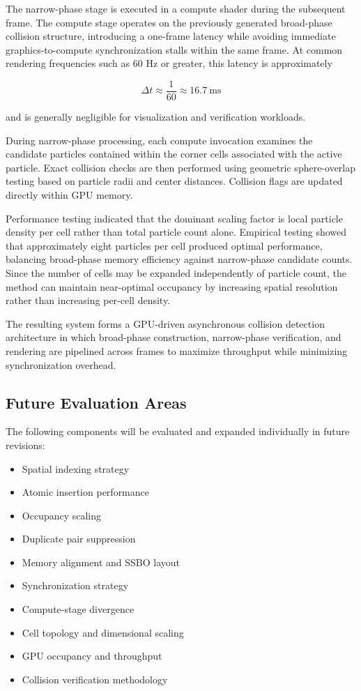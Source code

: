 \documentclass{article}
\begin{document}
The narrow-phase stage is executed in a compute shader during the subsequent frame. The compute stage operates on the previously generated broad-phase collision structure, introducing a one-frame latency while avoiding immediate graphics-to-compute synchronization stalls within the same frame. At common rendering frequencies such as 60 Hz or greater, this latency is approximately

\[
\Delta t \approx \frac{1}{60} \approx 16.7\ \mathrm{ms}
\]

and is generally negligible for visualization and verification workloads.

During narrow-phase processing, each compute invocation examines the candidate particles contained within the corner cells associated with the active particle. Exact collision checks are then performed using geometric sphere-overlap testing based on particle radii and center distances. Collision flags are updated directly within GPU memory.

Performance testing indicated that the dominant scaling factor is local particle density per cell rather than total particle count alone. Empirical testing showed that approximately eight particles per cell produced optimal performance, balancing broad-phase memory efficiency against narrow-phase candidate counts. Since the number of cells may be expanded independently of particle count, the method can maintain near-optimal occupancy by increasing spatial resolution rather than increasing per-cell density.

The resulting system forms a GPU-driven asynchronous collision detection architecture in which broad-phase construction, narrow-phase verification, and rendering are pipelined across frames to maximize throughput while minimizing synchronization overhead.

\subsection{Future Evaluation Areas}

The following components will be evaluated and expanded individually in future revisions:

\begin{itemize}
    \item Spatial indexing strategy
    \item Atomic insertion performance
    \item Occupancy scaling
    \item Duplicate pair suppression
    \item Memory alignment and SSBO layout
    \item Synchronization strategy
    \item Compute-stage divergence
    \item Cell topology and dimensional scaling
    \item GPU occupancy and throughput
    \item Collision verification methodology
\end{itemize}
\end{document}
